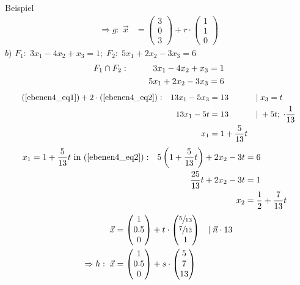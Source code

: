 \documentclass{article}
\begin{document}
\begin{boxx}[DarkBlue]{Beispiel}
\begin{align*}
        \Rightarrow g:\;\vec{x} &= \begin{pmatrix}3\\0\\3\end{pmatrix} + r \cdot \begin{pmatrix}1\\1\\0\end{pmatrix}
    \end{align*}
    $b)$\hspace{3mm} $F_1:\; 3x_1 - 4x_2 + x_3 = 1;\; F_2:\;5x_1 + 2x_2 - 3x_3 = 6$
    \begin{align}
        F_1 \cap F_2: \hspace*{10mm}3x_1 - 4x_2 + x_3 &= 1 \label{ebenen4_eq1}\\
        5x_1 + 2x_2 - 3x_3 &= 6 \label{ebenen4_eq2}
    \end{align}
    \begin{align*}
        &&&&&\text{(\ref{ebenen4_eq1})} + 2\cdot\text{(\ref{ebenen4_eq2})}: & 13x_1 - 5x_3 &= 13&&|\;x_3=t&&&& \\
        &&&&&& 13x_1 -5t &= 13 &&|\;+5t;\;\cdot \frac{1}{13}\\
        &&&&&& x_1 &= 1 + \frac{5}{13}t && \\
    \end{align*}
    \begin{align*}
        &&&&&x_1 = 1 + \frac{5}{13}t \text{ in (\ref{ebenen4_eq2})}: &5\left(1+\frac{5}{13}t\right)+2x_2 -3t &= 6&&&&&& \\
        &&&&&&\frac{25}{13}t + 2x_2 -3t &= 1 \\
        &&&&&& x_2 &= \frac{1}{2} + \frac{7}{13}t
    \end{align*}
    \begin{align*}
        &&\vec{x} &= \begin{pmatrix}1\\0.5\\0\end{pmatrix} + t \cdot \begin{pmatrix}\sfrac{5}{13}\\\sfrac{7}{13}\\1\end{pmatrix} &&|\;\vec{n} \cdot 13&&\\
        &&\Rightarrow h:\;\vec{x} &= \begin{pmatrix}1\\0.5\\0\end{pmatrix} + s \cdot \begin{pmatrix}5\\7\\13\end{pmatrix}
    \end{align*}
\end{boxx}
\newpage
\end{document}
